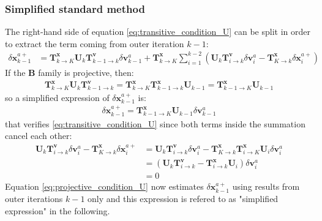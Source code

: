 \documentclass[npg, manuscript]{copernicus}
\begin{document}
\subsubsection{Simplified standard method}
The right-hand side of equation \eqref{eq:transitive_condition_U} can be split in order to extract the term coming from outer iteration $k-1$:
\begin{align}
\delta \mathbf{x}^{a+}_{k-1} & = \mathbf{T}^\mathbf{x}_{k \rightarrow K} \mathbf{U}_k \mathbf{T}^\mathbf{v}_{k-1 \rightarrow k} \delta \mathbf{v}^a_{k-1} + \mathbf{T}^\mathbf{x}_{k \rightarrow K} \sum_{i=1}^{k-2} \left(\mathbf{U}_k \mathbf{T}^\mathbf{v}_{i \rightarrow k} \delta \mathbf{v}^a_i - \mathbf{T}^\mathbf{x}_{K \rightarrow k} \delta \mathbf{x}^{a+}_i\right)
\end{align}
If the $\mathbf{B}$ family is projective, then:
\begin{align}
\mathbf{T}^\mathbf{x}_{k \rightarrow K} \mathbf{U}_k \mathbf{T}^\mathbf{v}_{k-1 \rightarrow k} = \mathbf{T}^\mathbf{x}_{k \rightarrow K} \mathbf{T}^\mathbf{x}_{k-1 \rightarrow k} \mathbf{U}_{k-1} = \mathbf{T}^\mathbf{x}_{k-1 \rightarrow K} \mathbf{U}_{k-1}
\end{align}
so a simplified expression of $\delta \mathbf{x}^{a+}_{k-1}$ is:
\begin{align}
\label{eq:projective_condition_U}
\boxed{\delta \mathbf{x}^{a+}_{k-1} = \mathbf{T}^\mathbf{x}_{k-1 \rightarrow K} \mathbf{U}_{k-1} \delta \mathbf{v}^a_{k-1}}
\end{align}
that verifies \eqref{eq:transitive_condition_U} since both terms inside the summation cancel each other:
\begin{align}
\mathbf{U}_k \mathbf{T}^\mathbf{v}_{i \rightarrow k} \delta \mathbf{v}^a_i - \mathbf{T}^\mathbf{x}_{K \rightarrow k} \delta \mathbf{x}^{a+}_i & = \mathbf{U}_k \mathbf{T}^\mathbf{v}_{i \rightarrow k} \delta \mathbf{v}^a_i - \mathbf{T}^\mathbf{x}_{K \rightarrow k} \mathbf{T}^\mathbf{x}_{i \rightarrow K} \mathbf{U}_i \delta \mathbf{v}^a_i \nonumber \\
& = \left(\mathbf{U}_k \mathbf{T}^\mathbf{v}_{i \rightarrow k} - \mathbf{T}^\mathbf{x}_{i \rightarrow k} \mathbf{U}_i \right) \delta \mathbf{v}^a_i \nonumber \\
& = 0
\end{align}
Equation \eqref{eq:projective_condition_U} now estimates $\delta \mathbf{x}^{a+}_{k-1}$ using results from outer iterations $k-1$ only and this expression is refered to as "simplified expression" in the following.
\end{document}

